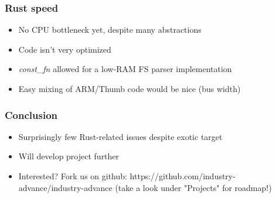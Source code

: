 \documentclass{beamer}
\begin{document}
\begin{frame}
	\frametitle{Rust speed}
	\begin{itemize}
		\item No CPU bottleneck yet, despite many abstractions
		\item Code isn't very optimized
		\item \emph{const\_fn} allowed for a low-RAM FS parser implementation
		\item Easy mixing of ARM/Thumb code would be nice (bus width)
	\end{itemize}
\end{frame}

\begin{frame}
	\frametitle{Conclusion}
	\begin{itemize}
		\item Surprisingly few Rust-related issues despite exotic target
		\item Will develop project further
		\item Interested? Fork us on github: https://github.com/industry-advance/industry-advance (take a look under "Projects" for roadmap!)
	\end{itemize}
\end{frame}
\end{document}
